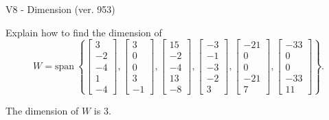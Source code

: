 \begin{exercise}
  \begin{exerciseTitle}V8 - Dimension (ver. 953)\end{exerciseTitle}
  \begin{exerciseStatement}
    Explain how to find the dimension of 
\[W=\mathrm{span}\ \left\{\left[\begin{array}{r}
3 \\
-2 \\
-4 \\
1 \\
-4
\end{array}\right] , \left[\begin{array}{r}
3 \\
0 \\
0 \\
3 \\
-1
\end{array}\right] , \left[\begin{array}{r}
15 \\
-2 \\
-4 \\
13 \\
-8
\end{array}\right] , \left[\begin{array}{r}
-3 \\
-1 \\
-3 \\
-2 \\
3
\end{array}\right] , \left[\begin{array}{r}
-21 \\
0 \\
0 \\
-21 \\
7
\end{array}\right] , \left[\begin{array}{r}
-33 \\
0 \\
0 \\
-33 \\
11
\end{array}\right]\right\}.\]



  \end{exerciseStatement}
  \begin{exerciseAnswer}
   The dimension of \(W\) is  \(3\).
  


  \end{exerciseAnswer}
\end{exercise}